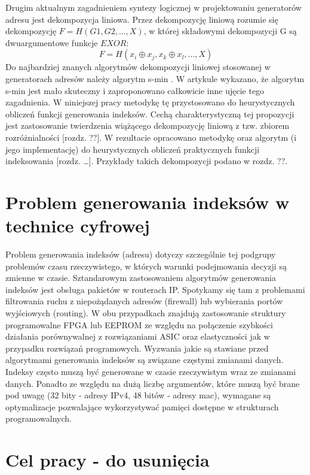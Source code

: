 Drugim aktualnym zagadnieniem syntezy logicznej w projektowaniu generatorów adresu jest dekompozycja liniowa.
Przez dekompozycję liniową rozumie się dekompozycję $F = H(G1, G2, ...,  X)$,
w której składowymi dekompozycji G są dwuargumentowe funkcje $EXOR$:
\begin{equation}
F = H (x_i \oplus x_j, x_k \oplus x_l, ..., X)
\end{equation}
Do najbardziej znanych algorytmów dekompozycji liniowej stosowanej w generatorach adresów należy algorytm s-min \cite{sasao-recent, sasao-s-min}.
W artykule \cite{redukcja-kompresja} wykazano, że algorytm s-min jest mało skuteczny i zaproponowano całkowicie inne ujęcie tego zagadnienia.
W niniejszej pracy metodykę tę przystosowano do heurystycznych obliczeń funkcji generowania indeksów.
Cechą charakterystyczną tej propozycji jest zastosowanie twierdzenia wiążącego dekompozycję liniową z tzw. zbiorem rozróżnialności [rozdz. ??].
W rezultacie opracowano metodykę oraz algorytm (i jego implementację) do heurystycznych obliczeń praktycznych funkcji indeksowania [rozdz. …].
Przykłady takich dekompozycji podano w rozdz. ??.

\section{Problem generowania indeksów w technice cyfrowej}

Problem generowania indeksów (adresu) dotyczy szczególnie tej podgrupy problemów czasu rzeczywistego,
w których warunki podejmowania decyzji są zmienne w czasie.
Sztandarowym zastosowaniem algorytmów generowania indeksów jest obsługa pakietów w routerach IP.
Spotykamy się tam z problemami filtrowania ruchu z niepożądanych adresów (firewall) lub wybierania portów wyjściowych (routing).
W obu przypadkach znajdują zastosowanie struktury programowalne FPGA lub EEPROM
ze względu na połączenie szybkości działania porównywalnej z rozwiązaniami ASIC oraz elastyczności jak w przypadku rozwiązań programowych.
Wyzwania jakie są stawiane przed algorytmami generowania indeksów są związane częstymi zmianami danych.
Indeksy często muszą być generowane w czasie rzeczywistym wraz ze zmianami danych.
Ponadto ze względu na dużą liczbę argumentów,
które muszą być brane pod uwagę (32 bity - adresy IPv4, 48 bitów - adresy mac),
wymagane są optymalizacje pozwalające wykorzystywać pamięci dostępne w strukturach programowalnych.

\section{Cel pracy - do usunięcia}

